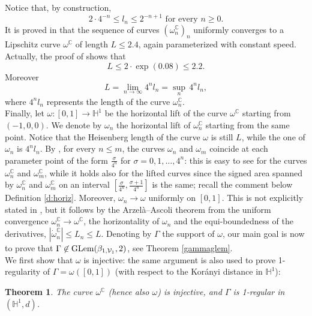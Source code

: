 \documentclass[12pt]{amsart}
\renewcommand{\H}{\mathbb H}
\newcommand{\C}{\mathbb C}
\numberwithin{equation}{section}
\theoremstyle{plain}
\newtheorem{theorem}{Theorem}[section]
\theoremstyle{definition}
\theoremstyle{remark}
\begin{document}
\noindent Notice that, by construction, 
\begin{equation}\label{eq:**}
    2\cdot4^{-n}\leq l_n\leq 2^{-n+1}\text{ for every }n\geq 0.
\end{equation}
It is proved in \cite[Proposition 3.1 and Lemma 3.2]{Juillet} that the sequence of curves $(\omega_n^\C)_n$ uniformly converges to a Lipschitz curve $\omega^\C$ of length $L\leq 2.4$, again parameterized with constant speed. 
Actually, the proof of \cite[Lemma 3.2]{Juillet} shows that
\begin{equation}\label{eq:*}
    L \leq 2 \cdot \exp(0.08)\leq 2.2.
\end{equation}
Moreover \begin{equation}\label{limitlength}L=\lim_{n\to\infty} 4^nl_n= \sup_n\, 4^nl_n,\end{equation} where $4^nl_n$ represents the length of the curve $\omega_n^\C$. \medskip\\Finally, let $\omega:[0,1]\to\H^1$ be the horizontal lift of the curve $\omega^\C$ starting from $(-1,0,0) $. We denote by $\omega_n$ the horizontal lift of $\omega_n^\C$ starting from the same point. Notice that the Heisenberg length of the curve $\omega$ is still $L$, while  the one of $\omega_n$ is $4^n l_n$. By \cite[Lemma 3.3]{Juillet}, for every $n\leq m$, the curves $\omega_n$ and $\omega_{m}$ coincide at each parameter point of the form $\frac{\sigma}{4^n}$ for $\sigma=0,1,\dots,4^n$: this is easy to see for the curves $\omega_n^\C$ and $\omega_m^\C$, while it holds also for the lifted curves since the signed area spanned by $\omega_n^\C$ and $\omega_m^\C$ on an interval $[\frac{\sigma}{4^n},\frac{\sigma+1}{4^n}]$ is the same; recall the comment below Definition \ref{d:horiz}.
Moreover, $\omega_n\to\omega$ uniformly on $[0,1]$. This is not explicitly stated in \cite{Juillet}, but it follows by 
the Arzel\`{a}–Ascoli theorem 
from the uniform convergence  $\omega_n^\C\to\omega^\C$, the horizontality of $\omega_n$ and the equi-boundedness of the derivatives, $|\dot{\omega}_n^\C|\leq L_n\leq L$.
Denoting by $\Gamma$ the support of $\omega$, our main goal is now to prove that $\Gamma\not\in{\rm GLem}(\beta_{1,\mathcal V_1},2)$, see Theorem \ref{gammaglem}.
\medskip\\
We first show that $\omega$ is injective: the same argument is also used to prove 1-regularity of $\Gamma=\omega([0,1])$ (with respect to the Korányi distance in $\H^1$):
\begin{theorem}\label{injective}
    The curve $\omega^\C$ (hence also  $\omega$) is injective, and $\Gamma$ is 1-regular in $(\mathbb{H}^1,d)$.
\end{theorem}
\end{document}
